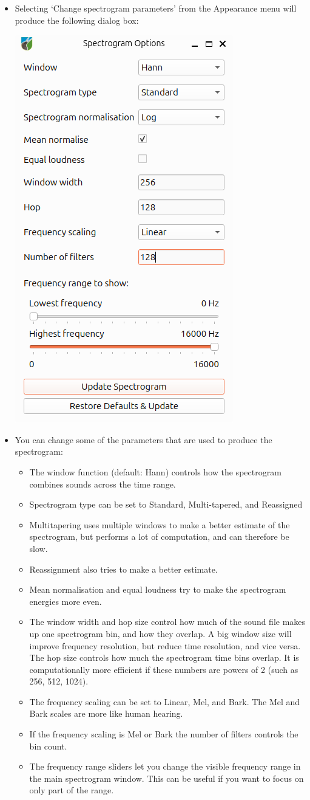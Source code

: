 \documentclass{article}
\begin{document}
\begin{itemize}
\item Selecting `Change spectrogram parameters' from the Appearance menu will produce the following dialog box:

\begin{center}
    \includegraphics[width=.4\textwidth]{Figures/SpectrogramOptions}
\end{center}

\item You can change some of the parameters that are used to produce the spectrogram:

\begin{itemize}
\item The window function (default: Hann) controls how the spectrogram combines sounds across the time range. 
\item Spectrogram type can be set to Standard, Multi-tapered, and Reassigned
\item Multitapering uses multiple windows to make a better estimate of the spectrogram, but performs a lot of computation, and can therefore be slow.
\item Reassignment also tries to make a better estimate.
\item Mean normalisation and equal loudness try to make the spectrogram energies more even.
\item The window width and hop size control how much of the sound file makes up one spectrogram bin, and how they overlap. A big window size will improve frequency resolution, but reduce time resolution, and vice versa. The hop size controls how much the spectrogram time bins overlap. It is computationally more efficient if these numbers are powers of 2 (such as 256, 512, 1024).
\item The frequency scaling can be set to Linear, Mel, and Bark. The Mel and Bark scales are more like human hearing. 
\item If the frequency scaling is Mel or Bark the number of filters controls the bin count.
\item The frequency range sliders let you change the visible frequency range in the main spectrogram window. This can be useful if you want to focus on only part of the range.
\end{itemize}


\end{itemize}
\end{document}

